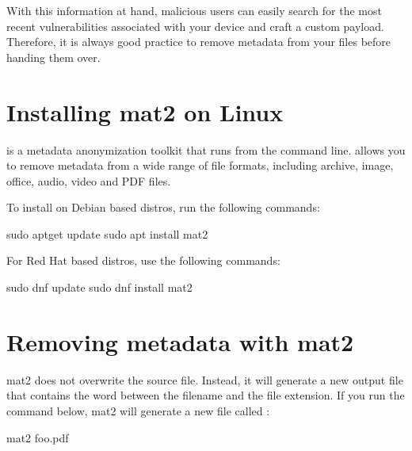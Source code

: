 \documentclass[a4paper,10pt,english,openany,oneside]{sphinxmanual}
\begin{document}
\sphinxAtStartPar
With this information at hand, malicious users can easily search for the most recent vulnerabilities associated with your device and craft a custom payload. Therefore, it is always good practice to remove metadata from your files before handing them over.


\section{Installing mat2 on Linux}
\label{\detokenize{metadata-compression:installing-mat2-on-linux}}
\sphinxAtStartPar
{} is a metadata anonymization toolkit that runs from the command line.  allows you to remove metadata from a wide range of file formats, including archive, image, office, audio, video and PDF files.

\sphinxAtStartPar
To install  on Debian based distros, run the following commands:

\begin{sphinxVerbatim}[commandchars=\\\{\}]
sudo apt\PYGZhy{}get update
sudo apt install mat2
\end{sphinxVerbatim}

\sphinxAtStartPar
For Red Hat based distros, use the following commands:

\begin{sphinxVerbatim}[commandchars=\\\{\}]
sudo dnf update
sudo dnf install mat2
\end{sphinxVerbatim}


\section{Removing metadata with mat2}
\label{\detokenize{metadata-compression:removing-metadata-with-mat2}}
\sphinxAtStartPar
mat2 does not overwrite the source file. Instead, it will generate a new output file that contains the word  between the filename and the file extension. If you run the command below, mat2 will generate a new file called :

\begin{sphinxVerbatim}[commandchars=\\\{\}]
mat2 foo.pdf
\end{sphinxVerbatim}
\end{document}
